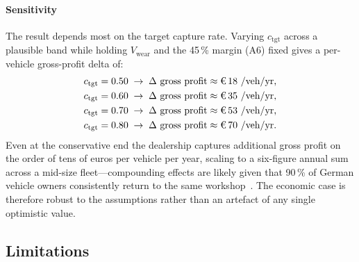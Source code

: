 \documentclass[conference,a4paper]{IEEEtran}
\newcommand{\eur}{\ifmmode\text{\texteuro}\else\texteuro\fi}
\newcommand{\cSoll}{c_{\mathrm{tgt}}}
\begin{document}
\paragraph*{Sensitivity}
The result depends most on the target capture rate. Varying $\cSoll$ across a
plausible band while holding $V_{\mathrm{wear}}$ and the 45\,\% margin (A6) fixed
gives a per-vehicle gross-profit delta of:
\begin{align*}
\cSoll = 0.50 &\;\rightarrow\; \Delta \text{ gross profit} \approx \eur\,18~\text{/veh/yr,} \\
\cSoll = 0.60 &\;\rightarrow\; \Delta \text{ gross profit} \approx \eur\,35~\text{/veh/yr,} \\
\cSoll = 0.70 &\;\rightarrow\; \Delta \text{ gross profit} \approx \eur\,53~\text{/veh/yr,} \\
\cSoll = 0.80 &\;\rightarrow\; \Delta \text{ gross profit} \approx \eur\,70~\text{/veh/yr.}
\end{align*}
Even at the conservative end the dealership captures additional gross profit on
the order of tens of euros per vehicle per year, scaling to a six-figure annual
sum across a mid-size fleet---compounding effects are likely given that 90\,\% of
German vehicle owners consistently return to the same workshop~\cite{dat2026report}. The
economic case is therefore robust to the assumptions rather than an artefact of
any single optimistic value.

\subsection{Limitations}\label{sec:lim}
\end{document}
